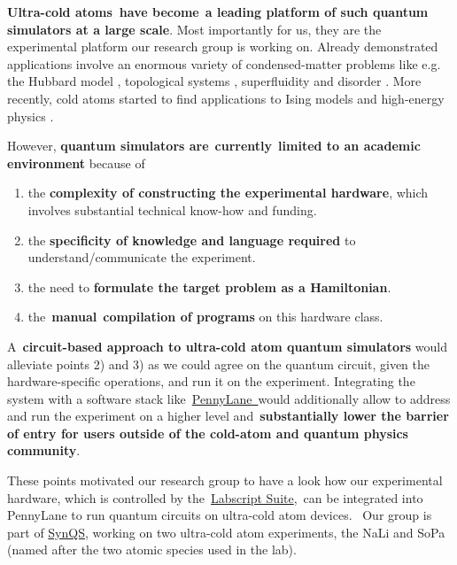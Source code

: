 \documentclass[%
 reprint,
 amsmath,amssymb,
 aps,
]{revtex4-1}
\providecommand{\tightlist}{\setlength{\itemsep}{0pt}\setlength{\parskip}{0pt}}%
\begin{document}
\textbf{Ultra-cold atoms~have become}~\textbf{a leading platform of such
quantum simulators at a large scale}. Most importantly for us, they are
the experimental platform our research group is working on. Already
demonstrated applications involve an enormous variety of
condensed-matter problems like e.g. the Hubbard model
\cite{Bloch_2008}, topological systems \cite{Goldman_2014} ,
superfluidity \cite{Regal_2007} and disorder \cite{Lagendijk_2009} . More
recently, cold atoms started to find applications to Ising models
\cite{Bernien2017} and high-energy physics \cite{Zohar2016}. ~

However, \textbf{quantum simulators
are}~\textbf{currently}~\textbf{limited to an academic environment}
because of~

\begin{enumerate}
\tightlist
\item
  the \textbf{complexity of constructing the experimental hardware},
  which involves substantial technical know-how and funding.
\item
  the \textbf{specificity of knowledge and language required} to
  understand/communicate the experiment.
\item
  the need to \textbf{formulate the target problem as a Hamiltonian}.
\item
  the~\textbf{manual}~\textbf{compilation of programs} on this hardware
  class.~
\end{enumerate}

A~\textbf{circuit-based approach to ultra-cold atom quantum simulators}
would alleviate points 2) and 3) as we could agree on the quantum
circuit, given the hardware-specific operations, and run it on the
experiment. Integrating the system with a software stack
like~\href{https://pennylane.ai/}{PennyLane~}would additionally allow to
address and run the experiment on a higher level
and~\textbf{substantially lower the barrier of entry for users outside
of the cold-atom and quantum physics community}. ~

These points motivated our research group to have a look how our
experimental hardware, which is controlled by
the~\href{http://labscriptsuite.org/}{Labscript Suite},~can be
integrated into PennyLane to run quantum circuits on ultra-cold atom
devices.~ Our group is part of
\href{http://www.kip.uni-heidelberg.de/synqs/}{SynQS}, working on two
ultra-cold atom experiments, the NaLi and SoPa (named after the two
atomic species used in the lab).

\par\null
\end{document}
